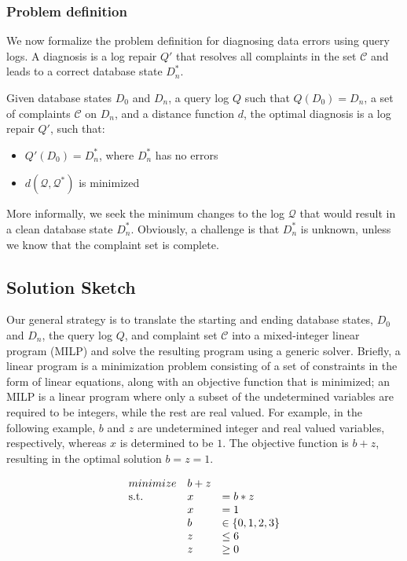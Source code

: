 \subsubsection*{Problem definition}

We now formalize the problem definition for diagnosing data
errors using query logs. A diagnosis is a log repair
$Q'$ that resolves all complaints in the set $\mathcal{C}$
and leads to a correct database state $D_n^*$.

\begin{definition}\label{def:problem}
    Given database states $D_0$ and $D_n$, a query log $Q$ 
    such that $Q(D_0)=D_n$, a set of complaints $\mathcal{C}$ on $D_n$,  
    and a distance function $d$, the optimal diagnosis is a 
    log repair $Q'$, such that:
    \begin{itemize}[itemsep=0pt, parsep=0pt]
        \item $Q'(D_0)=D_n^*$, where $D_n^*$ has no errors
        \item $d(\mathcal{Q}, \mathcal{Q}^*)$ is minimized
    \end{itemize}
\end{definition}

More informally, we seek the minimum changes to the log $\mathcal{Q}$
that would result in a clean database state $D_n^*$. Obviously, a
challenge is that $D_n^*$ is unknown, unless we know that the
complaint set is complete. 


\subsection{Solution Sketch}

Our general strategy is to translate the starting
and ending database states, $D_0$ and $D_n$, the query log $Q$, and
complaint set $\mathcal{C}$ into a mixed-integer linear program (MILP)
and solve the resulting program using a generic solver.  
Briefly, a linear program is a minimization problem consisting of
a set of constraints in the form of linear equations, along with
an objective function that is minimized; an MILP is a linear program
where only a subset of the undetermined variables are required to
be integers, while the rest are real valued.  For example, in the following
example, $b$ and $z$ are undetermined integer and real valued variables, respectively,
whereas $x$ is determined to be $1$.  The objective function is $b+z$, 
resulting in the optimal solution $b = z = 1$.

\[
\begin{array}{l l l}
minimize      & b + z\\
\mbox{s.t.}   &x &= b * z \\
              &x &= 1\\
              &b &\in \{0, 1, 2, 3\}\\
              &z &\le 6\\
              &z &\ge 0\\
\end{array}
\]


